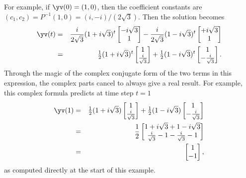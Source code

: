 \begin{example}
\begin{solution}
For example, if \(\yv(0)=(1,0)\), then the coefficient constants are \((c_1,c_2)=P^{-1}(1,0)=(i,-i)/(2\sqrt3)\).
Then the solution becomes
\begin{eqnarray*}
\yv(t)&=&\frac i{2\sqrt3}(1+i\sqrt3)^t\begin{bmatrix} -i\sqrt3\\1 \end{bmatrix}
-\frac{i}{2\sqrt3}(1-i\sqrt3)^t\begin{bmatrix} +i\sqrt3\\1 \end{bmatrix}
\\&=&\tfrac 12(1+i\sqrt3)^t\begin{bmatrix} 1\\\frac i{\sqrt3} \end{bmatrix}
+\tfrac12(1-i\sqrt3)^t\begin{bmatrix} 1\\-\frac i{\sqrt3} \end{bmatrix}.
\end{eqnarray*}
Through the magic of the complex conjugate form of the two terms in this expression, the complex parts cancel to always give a real result.
For example, this complex formula predicts at time step \(t=1\)
\begin{eqnarray*}
\yv(1)&=&\tfrac 12(1+i\sqrt3)\begin{bmatrix} 1\\\frac i{\sqrt3} \end{bmatrix}
+\tfrac12(1-i\sqrt3)\begin{bmatrix} 1\\-\frac i{\sqrt3} \end{bmatrix}
\\&=&\frac12\begin{bmatrix} 1+i\sqrt3+1-i\sqrt3\\
\frac i{\sqrt3}-1-\frac i{\sqrt3}-1 \end{bmatrix}
\\&=&\begin{bmatrix} 1\\-1 \end{bmatrix},
\end{eqnarray*}
as computed directly at the start of this example.
\end{solution}
\end{example}

